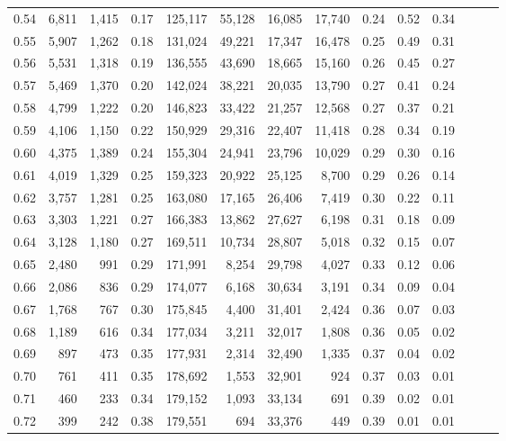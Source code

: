 \begin{tabular}{rrrrrrrrrrrrrr}
0.54 &  6,811 &  1,415 &  0.17 &  125,117 &   55,128 &  16,085 &  17,740 &  0.24 &  0.52 &      0.34 \\
0.55 &  5,907 &  1,262 &  0.18 &  131,024 &   49,221 &  17,347 &  16,478 &  0.25 &  0.49 &      0.31 \\
0.56 &  5,531 &  1,318 &  0.19 &  136,555 &   43,690 &  18,665 &  15,160 &  0.26 &  0.45 &      0.27 \\
0.57 &  5,469 &  1,370 &  0.20 &  142,024 &   38,221 &  20,035 &  13,790 &  0.27 &  0.41 &      0.24 \\
0.58 &  4,799 &  1,222 &  0.20 &  146,823 &   33,422 &  21,257 &  12,568 &  0.27 &  0.37 &      0.21 \\
0.59 &  4,106 &  1,150 &  0.22 &  150,929 &   29,316 &  22,407 &  11,418 &  0.28 &  0.34 &      0.19 \\
0.60 &  4,375 &  1,389 &  0.24 &  155,304 &   24,941 &  23,796 &  10,029 &  0.29 &  0.30 &      0.16 \\
0.61 &  4,019 &  1,329 &  0.25 &  159,323 &   20,922 &  25,125 &   8,700 &  0.29 &  0.26 &      0.14 \\
0.62 &  3,757 &  1,281 &  0.25 &  163,080 &   17,165 &  26,406 &   7,419 &  0.30 &  0.22 &      0.11 \\
0.63 &  3,303 &  1,221 &  0.27 &  166,383 &   13,862 &  27,627 &   6,198 &  0.31 &  0.18 &      0.09 \\
0.64 &  3,128 &  1,180 &  0.27 &  169,511 &   10,734 &  28,807 &   5,018 &  0.32 &  0.15 &      0.07 \\
0.65 &  2,480 &    991 &  0.29 &  171,991 &    8,254 &  29,798 &   4,027 &  0.33 &  0.12 &      0.06 \\
0.66 &  2,086 &    836 &  0.29 &  174,077 &    6,168 &  30,634 &   3,191 &  0.34 &  0.09 &      0.04 \\
0.67 &  1,768 &    767 &  0.30 &  175,845 &    4,400 &  31,401 &   2,424 &  0.36 &  0.07 &      0.03 \\
0.68 &  1,189 &    616 &  0.34 &  177,034 &    3,211 &  32,017 &   1,808 &  0.36 &  0.05 &      0.02 \\
0.69 &    897 &    473 &  0.35 &  177,931 &    2,314 &  32,490 &   1,335 &  0.37 &  0.04 &      0.02 \\
0.70 &    761 &    411 &  0.35 &  178,692 &    1,553 &  32,901 &     924 &  0.37 &  0.03 &      0.01 \\
0.71 &    460 &    233 &  0.34 &  179,152 &    1,093 &  33,134 &     691 &  0.39 &  0.02 &      0.01 \\
0.72 &    399 &    242 &  0.38 &  179,551 &      694 &  33,376 &     449 &  0.39 &  0.01 &      0.01 \\

\end{tabular}
